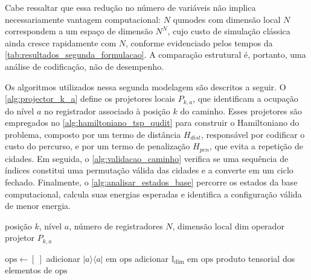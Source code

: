     Cabe ressaltar que essa redução no número de variáveis não implica necessariamente vantagem computacional: $N$ qumodes com dimensão local $N$ correspondem a um espaço de dimensão $N^N$, cujo custo de simulação clássica ainda cresce rapidamente com $N$, conforme evidenciado pelos tempos da \autoref{tab:resultados_segunda_formulacao}. A comparação estrutural é, portanto, uma análise de codificação, não de desempenho.

    Os algoritmos utilizados nessa segunda modelagem são descritos a seguir. O \autoref{alg:projector_k_a} define os projetores locais $P_{k,a}$, que identificam a ocupação do nível $a$ no registrador associado à posição $k$ do caminho. Esses projetores são empregados no \autoref{alg:hamiltoniano_tsp_qudit} para construir o Hamiltoniano do problema, composto por um termo de distância $H_{dist}$, responsável por codificar o custo do percurso, e por um termo de penalização $H_{pen}$, que evita a repetição de cidades. Em seguida, o \autoref{alg:validacao_caminho} verifica se uma sequência de índices constitui uma permutação válida das cidades e a converte em um ciclo fechado. Finalmente, o \autoref{alg:analisar_estados_base} percorre os estados da base computacional, calcula suas energias esperadas e identifica a configuração válida de menor energia.

        
\begin{algorithm}[!htbp]
\caption{Construção do projetor local}
\label{alg:projector_k_a}
\begin{algorithmic}[1]
\Require posição $k$, nível $a$, número de registradores $N$, dimensão local $\mathrm{dim}$
\Ensure operador projetor $P_{k,a}$

\State $\mathrm{ops} \gets [\ ]$
        \State adicionar $|a\rangle\langle a|$ em $\mathrm{ops}$
    \Else
        \State adicionar $\mathbb{I}_{\mathrm{dim}}$ em $\mathrm{ops}$
    \EndIf
\EndFor
\State \Return produto tensorial dos elementos de $\mathrm{ops}$
\end{algorithmic}
\end{algorithm}

